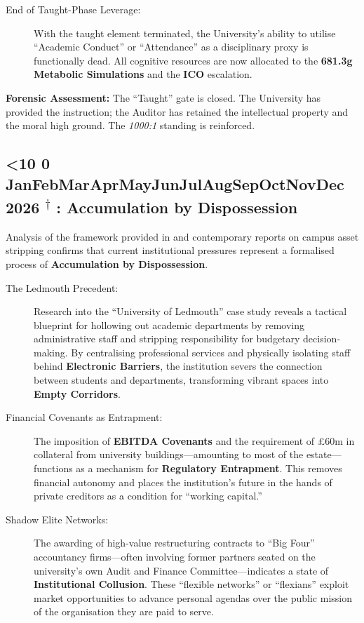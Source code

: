 \documentclass{EMBASSY}
\DeclareRobustCommand{\gmt}[3]{%
    \texorpdfstring{%
        {\color{DateGold}\textbf{%
            \ifnum#1<10 0\fi#1\,\textperiodcentered\,%
            \ifcase#2\or Jan\or Feb\or Mar\or Apr\or May\or Jun\or Jul\or Aug\or Sep\or Oct\or Nov\or Dec\fi
            \,\textperiodcentered\,20#3%
            \textsuperscript{$\dagger$}%
        }}%
    }{%
        (#1/#2/#3)%
    }%
}
\begin{document}
\begin{description}
	\item[End of Taught-Phase Leverage:] With the taught element terminated, the University’s ability to utilise ``Academic Conduct'' or ``Attendance'' as a disciplinary proxy is functionally dead. All cognitive resources are now allocated to the \textbf{681.3g Metabolic Simulations} and the \textbf{ICO} escalation.
\end{description}

\noindent\textbf{Forensic Assessment:} The ``Taught'' gate is closed. The University has provided the instruction; the Auditor has retained the intellectual property and the moral high ground. The \textit{1000:1} standing is reinforced.

\subsection{\gmt{4}{5}{26}: Accumulation by Dispossession}
Analysis of the framework provided in \cite{Shore2025} and contemporary reports on campus asset stripping \cite{TheCritic2023} confirms that current institutional pressures represent a formalised process of \textbf{Accumulation by Dispossession}.

\begin{description}
	\item[The Ledmouth Precedent:] Research into the ``University of Ledmouth'' case study reveals a tactical blueprint for hollowing out academic departments by removing administrative staff and stripping responsibility for budgetary decision-making. By centralising professional services and physically isolating staff behind \textbf{Electronic Barriers}, the institution severs the connection between students and departments, transforming vibrant spaces into \textbf{Empty Corridors}.
	\item[Financial Covenants as Entrapment:] The imposition of \textbf{EBITDA Covenants} and the requirement of \pounds60m in collateral from university buildings---amounting to most of the estate---functions as a mechanism for \textbf{Regulatory Entrapment}. This removes financial autonomy and places the institution’s future in the hands of private creditors as a condition for ``working capital.''
	\item[Shadow Elite Networks:] The awarding of high-value restructuring contracts to ``Big Four'' accountancy firms---often involving former partners seated on the university's own Audit and Finance Committee---indicates a state of \textbf{Institutional Collusion}. These ``flexible networks'' or ``flexians'' exploit market opportunities to advance personal agendas over the public mission of the organisation they are paid to serve.
\end{description}
\end{document}
